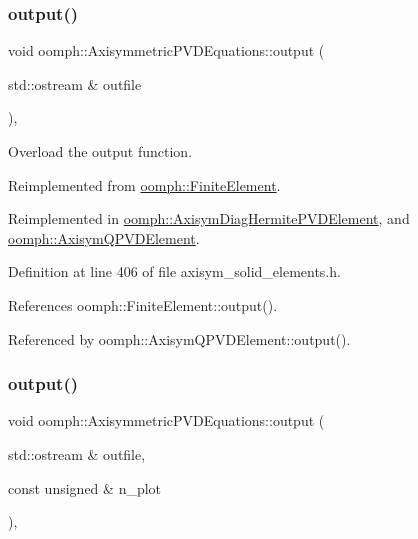 \subsubsection{\texorpdfstring{output()}{output()}\hspace{0.1cm}{\footnotesize\ttfamily [1/4]}}
{\footnotesize\ttfamily void oomph\+::\+Axisymmetric\+P\+V\+D\+Equations\+::output (\begin{DoxyParamCaption}\item[{std\+::ostream \&}]{outfile }\end{DoxyParamCaption})\hspace{0.3cm}{\ttfamily [inline]}, {\ttfamily [virtual]}}



Overload the output function. 



Reimplemented from \hyperlink{classoomph_1_1FiniteElement_a2ad98a3d2ef4999f1bef62c0ff13f2a7}{oomph\+::\+Finite\+Element}.



Reimplemented in \hyperlink{classoomph_1_1AxisymDiagHermitePVDElement_a6b513539d6607d36d0e048a289fc7a46}{oomph\+::\+Axisym\+Diag\+Hermite\+P\+V\+D\+Element}, and \hyperlink{classoomph_1_1AxisymQPVDElement_ac2a240575dea087098520bf6f9567dc2}{oomph\+::\+Axisym\+Q\+P\+V\+D\+Element}.



Definition at line 406 of file axisym\+\_\+solid\+\_\+elements.\+h.



References oomph\+::\+Finite\+Element\+::output().



Referenced by oomph\+::\+Axisym\+Q\+P\+V\+D\+Element\+::output().

\mbox{\label{classoomph_1_1AxisymmetricPVDEquations_a35cf174ca1692f817e3182166e22ef4b}} 
\subsubsection{\texorpdfstring{output()}{output()}\hspace{0.1cm}{\footnotesize\ttfamily [2/4]}}
{\footnotesize\ttfamily void oomph\+::\+Axisymmetric\+P\+V\+D\+Equations\+::output (\begin{DoxyParamCaption}\item[{std\+::ostream \&}]{outfile,  }\item[{const unsigned \&}]{n\+\_\+plot }\end{DoxyParamCaption})\hspace{0.3cm}{\ttfamily [inline]}, {\ttfamily [virtual]}}




